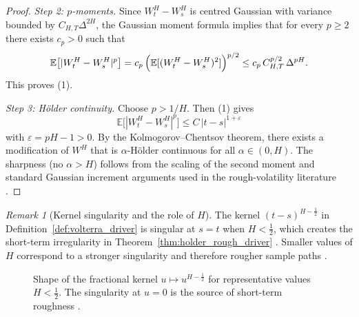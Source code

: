 \documentclass[12pt,a4paper]{article}
\theoremstyle{definition}
\theoremstyle{plain}
\theoremstyle{remark}
\newtheorem{remark}{Remark}[section]
\theoremstyle{plain}
\begin{document}
\begin{proof}
\emph{Step 2: $p$-moments.}
Since $W^H_t-W^H_s$ is centred Gaussian with variance bounded by $C_{H,T}\Delta^{2H}$, the Gaussian moment formula implies that for every $p\ge 2$ there exists $c_p>0$ such that
\[
    \mathbb E\bigl[|W^H_t-W^H_s|^p\bigr]
    =
    c_p\,\Bigl(\mathbb E[(W^H_t-W^H_s)^2]\Bigr)^{p/2}
    \le
    c_p\,C_{H,T}^{p/2}\,\Delta^{pH}.
\]
This proves (1).

\emph{Step 3: H\"older continuity.}
Choose $p>1/H$. Then (1) gives
\[
    \mathbb E\bigl[|W^H_t-W^H_s|^p\bigr]
    \le
    C\,|t-s|^{1+\varepsilon}
\]
with $\varepsilon=pH-1>0$. By the Kolmogorov--Chentsov theorem, there exists a modification of $W^H$ that is $\alpha$-H\"older continuous for all $\alpha\in(0,H)$.
The sharpness (no $\alpha>H$) follows from the scaling of the second moment and standard Gaussian increment arguments used in the rough-volatility literature \cite{GatheralRough,BayerFriz2016}.
\end{proof}

\begin{remark}[Kernel singularity and the role of $H$]
\label{rem:kernel_singularity}
The kernel $(t-s)^{H-\frac12}$ in Definition~\ref{def:volterra_driver} is singular at $s=t$ when $H<\tfrac12$, which creates the short-term irregularity in Theorem~\ref{thm:holder_rough_driver} \cite{GatheralRough}. 
Smaller values of $H$ correspond to a stronger singularity and therefore rougher sample paths \cite{GatheralRough,BayerFriz2016}.
\end{remark}

\begin{figure}[H]
\centering
{}
\caption{Shape of the fractional kernel $u\mapsto u^{H-\frac12}$ for representative values $H<\tfrac12$. The singularity at $u=0$ is the source of short-term roughness \cite{GatheralRough,BayerFriz2016}.}
\label{fig:fractional_kernel_shapes}
\end{figure}
\FloatBarrier
\end{document}
